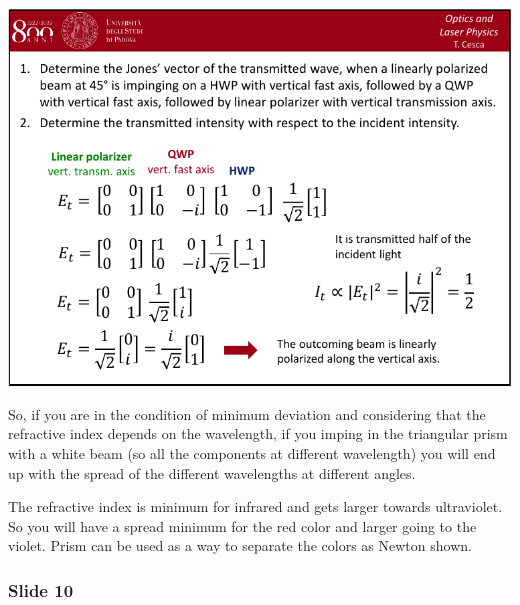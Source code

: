 \documentclass[../main/main.tex]{subfiles}
\begin{document}
\begin{minipage}[]{0.5\linewidth}
\centering
\includegraphics[page=9,width=1\textwidth]{../lessons/pdf_file/04_lecture.pdf}
\end{minipage}
\hspace{0.3cm}\vspace{0.3cm}
\begin{minipage}[c]{0.47\linewidth}

So, if you are in the condition of minimum deviation and considering that the refractive index depends on the wavelength, if you imping in the triangular prism with a white beam (so all the components at different wavelength) you will end up with the spread of the different wavelengths at different angles.

The refractive index is minimum for infrared and gets larger towards ultraviolet. So you will have a spread minimum for the red color and larger going to the violet. Prism can be used as a way to separate the colors as Newton shown.

\end{minipage}

\subsubsection*{Slide 10}
\end{document}
